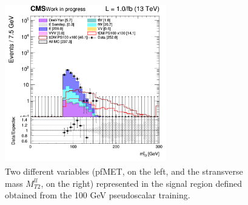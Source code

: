 \documentclass[a4paper, 10pt, openright]{report}
\begin{document}
\begin{figure}[htbp]
{\begin{minipage}[b]{.48\textwidth}
\end{minipage}\hfill
\begin{minipage}[b]{.48\textwidth}
\includegraphics[width=7cm, height=7cm]{figs/2017/SRBlinded-ttDM-pseudo100/log_cratio_topCR_ll_BDT_ttDM100_mt2ll.png}
\end{minipage} \hfill
}
\caption{Two different variables (pf\ac{MET}, on the left, and the stransverse mass $M_{T2}^{ll}$, on the right) represented in the signal region defined obtained from the 100 GeV pseudoscalar training.}
\label{fig:SR3}
\end{figure}
\end{document}
